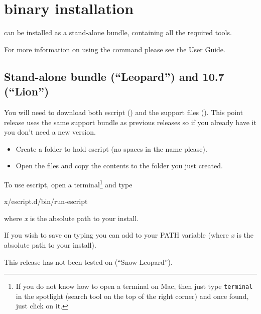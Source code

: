 %
%
%

\section{\macosx binary installation}
\label{sec:binmac}

\esfinley can be installed as a stand-alone bundle, containing all the required tools.

For more information on using the  command please see the User Guide.

\subsection{Stand-alone bundle  (``Leopard'') and 10.7 (``Lion'')}

You will need to download both escript () and the support files ().
This point release uses the same support bundle as previous releases so if you already have it you don't need a new version.
\begin{itemize}
\item Create a folder to hold escript (no spaces in the name please).
\item Open the  files and copy the contents to the folder you just created.
\end{itemize}

To use escript, open a terminal\footnote{If you do not know how to open a terminal on Mac, then just type \texttt{terminal} in the spotlight (search tool on the top of the right corner) and once found, just click on it.} and type
\begin{shellCode}
x/escript.d/bin/run-escript
\end{shellCode}
where \textit{x} is the absolute path to your install.

If you wish to save on typing you can add  to your PATH variable (where \textit{x} is the absolute path to your install). 

This release has not been tested on  (``Snow Leopard'').

